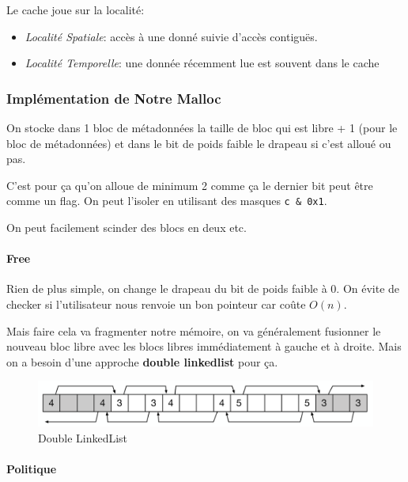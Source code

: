 Le cache joue sur la localité:

\begin{itemize}
\tightlist
\item
  \emph{Localité Spatiale}: accès à une donné suivie d'accès contiguës.
\item
  \emph{Localité Temporelle}: une donnée récemment lue est souvent dans
  le cache
\end{itemize}

\subsubsection{Implémentation de Notre
Malloc}\label{impluxe9mentation-de-notre-malloc}

On stocke dans 1 bloc de métadonnées la taille de bloc qui est libre + 1
(pour le bloc de métadonnées) et dans le bit de poids faible le drapeau
si c'est alloué ou pas.

C'est pour ça qu'on alloue de minimum 2 comme ça le dernier bit peut
être comme un flag. On peut l'isoler en utilisant des masques
\texttt{c\ \&\ 0x1}.

On peut facilement scinder des blocs en deux etc.

\paragraph{Free}\label{free}

Rien de plus simple, on change le drapeau du bit de poids faible à 0. On
évite de checker si l'utilisateur nous renvoie un bon pointeur car coûte
\(O(n)\).

Mais faire cela va fragmenter notre mémoire, on va généralement
fusionner le nouveau bloc libre avec les blocs libres immédiatement à
gauche et à droite. Mais on a besoin d'une approche \textbf{double
linkedlist} pour ça.

\begin{figure}
\centering
\includegraphics{image-50.png}
\caption{Double LinkedList}
\end{figure}

\paragraph{Politique}\label{politique}

